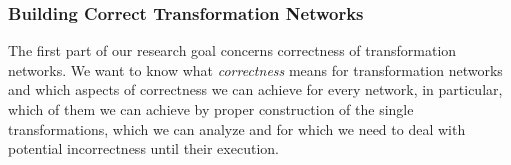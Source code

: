 



\subsubsection*{Building Correct Transformation Networks} %

The first part of our research goal concerns correctness of transformation networks.
We want to know what \emph{correctness} means for transformation networks and which aspects of correctness we can achieve for every network, in particular, which of them we can achieve by proper construction of the single transformations, which we can analyze and for which we need to deal with potential incorrectness until their execution.

